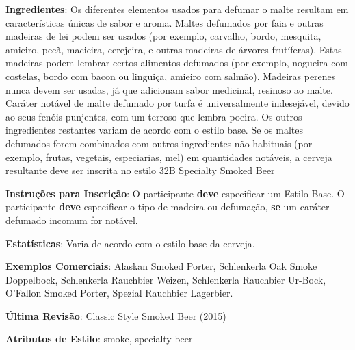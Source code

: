 \textbf{Ingredientes}: Os diferentes elementos usados para defumar o malte resultam em características únicas de sabor e aroma. Maltes defumados por faia e outras madeiras de lei podem ser usados (por exemplo, carvalho, bordo, mesquita, amieiro, pecã, macieira, cerejeira, e outras madeiras de árvores frutíferas). Estas madeiras podem lembrar certos alimentos defumados (por exemplo, nogueira com costelas, bordo com bacon ou linguiça, amieiro com salmão). Madeiras perenes nunca devem ser usadas, já que adicionam sabor medicinal, resinoso ao malte. Caráter notável de malte defumado por turfa é universalmente indesejável, devido ao seus fenóis punjentes, com um terroso que lembra poeira. Os outros ingredientes restantes variam de acordo com o estilo base. Se os maltes defumados forem combinados com outros ingredientes não habituais (por exemplo, frutas, vegetais, especiarias, mel) em quantidades notáveis, a cerveja resultante deve ser inscrita no estilo 32B Specialty Smoked Beer

\textbf{Instruções para Inscrição}: O participante \textbf{deve} especificar um Estilo Base. O participante \textbf{deve} especificar o tipo de madeira ou defumação, \textbf{se} um caráter defumado incomum for notável.

\textbf{Estatísticas}: Varia de acordo com o estilo base da cerveja.

\textbf{Exemplos Comerciais}: Alaskan Smoked Porter, Schlenkerla Oak Smoke Doppelbock, Schlenkerla Rauchbier Weizen, Schlenkerla Rauchbier Ur-Bock, O’Fallon Smoked Porter, Spezial Rauchbier Lagerbier.

\textbf{Última Revisão}: Classic Style Smoked Beer (2015)

\textbf{Atributos de Estilo}: smoke, specialty-beer
